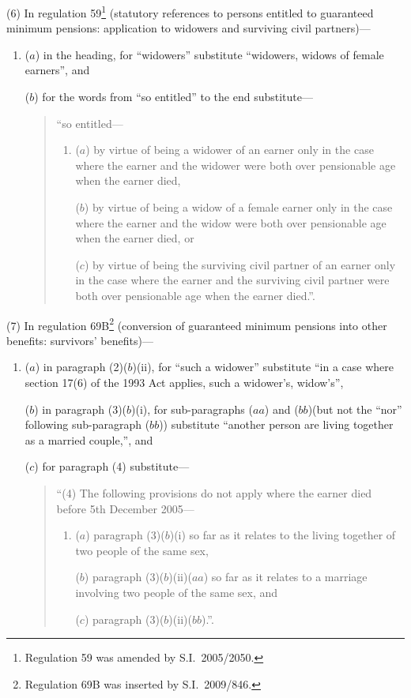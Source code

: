 \documentclass[12pt,a4paper]{article}
\begin{document}
(6) In regulation 59\footnote{Regulation 59 was amended by S.I.~2005/2050.} (statutory references to persons entitled to guaranteed minimum pensions: application to widowers and surviving civil partners)—
\begin{enumerate}\item[]
($a$) in the heading, for “widowers” substitute “widowers, widows of female earners”, and

($b$) for the words from “so entitled” to the end substitute—
\begin{quotation}
“so entitled—
\begin{enumerate}\item[]
($a$) by virtue of being a widower of an earner only in the case where the earner and the widower were both over pensionable age when the earner died,

($b$) by virtue of being a widow of a female earner only in the case where the earner and the widow were both over pensionable age when the earner died, or

($c$) by virtue of being the surviving civil partner of an earner only in the case where the earner and the surviving civil partner were both over pensionable age when the earner died.”.
\end{enumerate}
\end{quotation}
\end{enumerate}

(7) In regulation 69B\footnote{Regulation 69B was inserted by S.I.~2009/846.} (conversion of guaranteed minimum pensions into other benefits: survivors’ benefits)—
\begin{enumerate}\item[]
($a$) in paragraph (2)($b$)(ii), for “such a widower” substitute “in a case where section 17(6) of the 1993 Act applies, such a widower’s, widow’s”,

($b$) in paragraph (3)($b$)(i), for sub-paragraphs ($aa$) and ($bb$)(but not the “nor” following sub-paragraph ($bb$)) substitute “another person are living together as a married couple,”, and

($c$) for paragraph (4) substitute—
\begin{quotation}
“(4) The following provisions do not apply where the earner died before 5th December 2005—
\begin{enumerate}\item[]
($a$) paragraph (3)($b$)(i)  so far as it relates to the living together of two people of the same sex,

($b$) paragraph (3)($b$)(ii)($aa$) so far as it relates to a marriage involving two people of the same sex, and

($c$) paragraph (3)($b$)(ii)($bb$).”.
\end{enumerate}
\end{quotation}
\end{enumerate}
\end{document}
